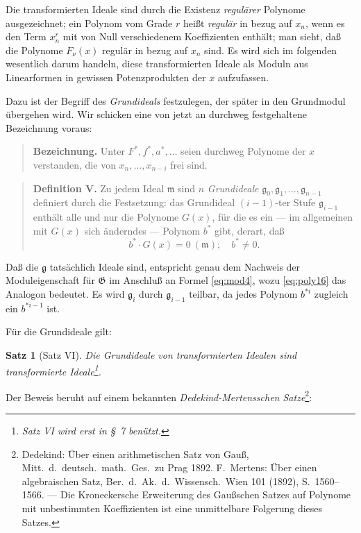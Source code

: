 \documentclass[fontsize=10pt,paper=a5,pagesize,headings=small]{scrbook}
\newcommand{\ideal}[1]{\mathfrak{#1}}
\theoremstyle{plain}
\newtheorem*{satz}{Satz}
\begin{document}
Die transformierten Ideale sind durch die Existenz \textit{regulärer} Polynome ausgezeichnet;
ein Polynom vom Grade $r$ heißt \textit{regulär} in bezug auf $x_n$, wenn es den Term $x_n^r$
mit von Null verschiedenem Koeffizienten enthält; man sieht, daß die Polynome $F_\nu(x)$
regulär in bezug auf $x_n$ sind. Es wird sich im folgenden wesentlich darum handeln,
diese transformierten Ideale als Moduln aus Linearformen in gewissen Potenzprodukten
der $x$ aufzufassen.

Dazu ist der Begriff des \textit{Grundideals} festzulegen, der später in den Grundmodul
übergehen wird. Wir schicken eine von jetzt an durchweg festgehaltene Bezeichnung voraus:

\begin{quote}
\textbf{Bezeichnung.} Unter $F^*, f^*, a^*,\dots$ seien durchweg Polynome der $x$ verstanden,
die von $x_n,\dots,x_{n-i}$ frei sind.
\end{quote}

\begin{quote}
\textbf{Definition V.} Zu jedem Ideal $\ideal{m}$ sind $n$ \textit{Grundideale}
$\ideal{g}_0, \ideal{g}_1,\dots, \ideal{g}_{n-1}$ definiert durch die Festsetzung: das Grundideal
$(i-1)$-ter Stufe $\ideal{g}_{i-1}$ enthält alle und nur die Polynome $G(x)$, für die es ein ---
im allgemeinen mit $G(x)$ sich änderndes --- Polynom $b^*$ gibt, derart, daß
\begin{equation}
\label{eq:poly16}
b^* \cdot G(x) = 0\ (\ideal{m});\quad b^* \neq 0.
\end{equation}
\end{quote}

Daß die $\ideal{g}$ tatsächlich Ideale sind, entspricht genau dem Nachweis der Moduleigenschaft
für $\mathfrak{G}$ im Anschluß an Formel \eqref{eq:mod4}, wozu \eqref{eq:poly16} das Analogon bedeutet.
Es wird $\ideal{g}_i$ durch $\ideal{g}_{i-1}$ teilbar, da jedes Polynom $b^{*i}$ zugleich ein $b^{*i-1}$ ist.

Für die Grundideale gilt:

\begin{satz}[Satz VI]
Die Grundideale von transformierten Idealen sind transformierte Ideale\footnote{Satz VI
wird erst in \S~7 benützt.}.
\end{satz}

Der Beweis beruht auf einem bekannten \textit{Dedekind-Mertensschen Satze}\footnote{Dedekind:
Über einen arithmetischen Satz von Gauß, Mitt.\ d.\ deutsch.\ math.\ Ges.\ zu Prag 1892.
F.~Mertens: Über einen algebraischen Satz, Ber.\ d.\ Ak.\ d.\ Wissensch.\ Wien 101 (1892),
S.~1560--1566. --- Die Kroneckersche Erweiterung des Gaußschen Satzes auf Polynome
mit unbestimmten Koeffizienten ist eine unmittelbare Folgerung dieses Satzes.}:
\end{document}
